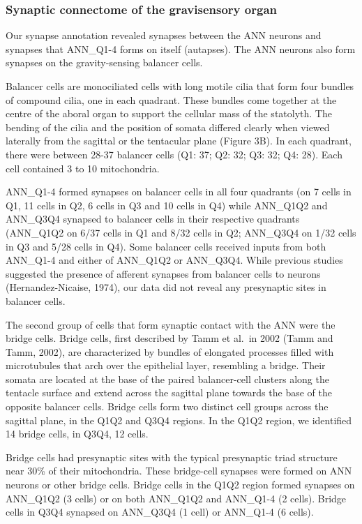 \documentclass[
  11pt,
]{article}
\begin{document}
\subsubsection{Synaptic connectome of the gravisensory
organ}\label{synaptic-connectome-of-the-gravisensory-organ}

Our synapse annotation revealed synapses between the ANN neurons and
synapses that ANN\_Q1-4 forms on itself (autapses). The ANN neurons also
form synapses on the gravity-sensing balancer cells.

Balancer cells are monociliated cells with long motile cilia that form
four bundles of compound cilia, one in each quadrant. These bundles come
together at the centre of the aboral organ to support the cellular mass
of the statolyth. The bending of the cilia and the position of somata
differed clearly when viewed laterally from the sagittal or the
tentacular plane (Figure 3B). In each quadrant, there were between 28-37
balancer cells (Q1: 37; Q2: 32; Q3: 32; Q4: 28). Each cell contained 3
to 10 mitochondria.

ANN\_Q1-4 formed synapses on balancer cells in all four quadrants (on 7
cells in Q1, 11 cells in Q2, 6 cells in Q3 and 10 cells in Q4) while
ANN\_Q1Q2 and ANN\_Q3Q4 synapsed to balancer cells in their respective
quadrants (ANN\_Q1Q2 on 6/37 cells in Q1 and 8/32 cells in Q2; ANN\_Q3Q4
on 1/32 cells in Q3 and 5/28 cells in Q4). Some balancer cells received
inputs from both ANN\_Q1-4 and either of ANN\_Q1Q2 or ANN\_Q3Q4. While
previous studies suggested the presence of afferent synapses from
balancer cells to neurons (Hernandez-Nicaise, 1974), our data did not
reveal any presynaptic sites in balancer cells.

The second group of cells that form synaptic contact with the ANN were
the bridge cells. Bridge cells, first described by Tamm et al.~in 2002
(Tamm and Tamm, 2002), are characterized by bundles of elongated
processes filled with microtubules that arch over the epithelial layer,
resembling a bridge. Their somata are located at the base of the paired
balancer-cell clusters along the tentacle surface and extend across the
sagittal plane towards the base of the opposite balancer cells. Bridge
cells form two distinct cell groups across the sagittal plane, in the
Q1Q2 and Q3Q4 regions. In the Q1Q2 region, we identified 14 bridge
cells, in Q3Q4, 12 cells.

Bridge cells had presynaptic sites with the typical presynaptic triad
structure near 30\% of their mitochondria. These bridge-cell synapses
were formed on ANN neurons or other bridge cells. Bridge cells in the
Q1Q2 region formed synapses on ANN\_Q1Q2 (3 cells) or on both ANN\_Q1Q2
and ANN\_Q1-4 (2 cells). Bridge cells in Q3Q4 synapsed on ANN\_Q3Q4 (1
cell) or ANN\_Q1-4 (6 cells).
\end{document}
